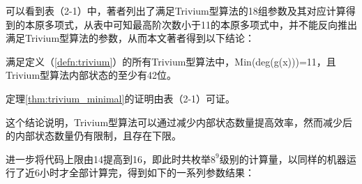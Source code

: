 可以看到表（2-1）中，著者列出了满足Trivium型算法的18组参数及其对应计算得到的本原多项式，从表中可知最高阶次数小于11的本原多项式中，并不能反向推出满足Trivium型算法的参数，从而本文著者得到以下结论：
\begin{thm}[Trivium型算法对应的本原多项式最高次数最小为11]
\label{thm:trivium_minimal}
满足定义（\ref{defn:trivium}）的所有Trivium型算法中，Min(deg(g(x)))=11，且Trivium型算法内部状态的至少有42位。

定理\ref{thm:trivium_minimal}的证明由表（2-1）可证。
\end{thm}

这个结论说明，Trivium型算法可以通过减少内部状态数量提高效率，然而减少后的内部状态数量仍有限制，且存在下限。

进一步将代码上限由14提高到16，即此时共枚举$8^9$级别的计算量，以同样的机器运行了近6小时才全部计算完，得到如下的一系列参数结果：

